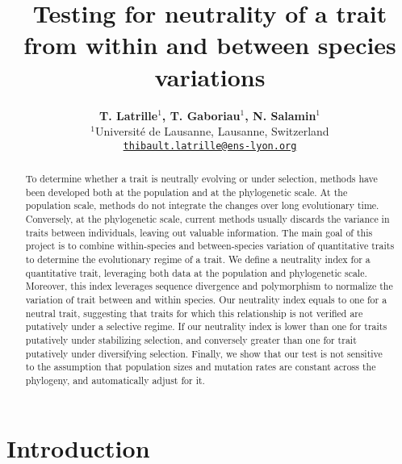 \documentclass{article}
\title{Testing for neutrality of a trait from within and between species variations}
\author{
\large
\textbf{T. {Latrille}$^{1}$, T. {Gaboriau}$^{1}$, N. {Salamin}$^{1}$}\\
\normalsize
$^{1}$Université de Lausanne, Lausanne, Switzerland\\
\texttt{\href{mailto:thibault.latrille@ens-lyon.org}{thibault.latrille@ens-lyon.org}} \\
}
\begin{document}
\maketitle

\begin{abstract}
    To determine whether a trait is neutrally evolving or under selection, methods have been developed both at the population and at the phylogenetic scale.
    At the population scale, methods do not integrate the changes over long evolutionary time.
    Conversely, at the phylogenetic scale, current methods usually discards the variance in traits between individuals, leaving out valuable information.
    The main goal of this project is to combine within-species and between-species variation of quantitative traits to determine the evolutionary regime of a trait.
    We define a neutrality index for a quantitative trait, leveraging both data at the population and phylogenetic scale.
    Moreover, this index leverages sequence divergence and polymorphism to normalize the variation of trait between and within species.
    Our neutrality index equals to one for a neutral trait, suggesting that traits for which this relationship is not verified are putatively under a selective regime.
    If our neutrality index is lower than one for traits putatively under stabilizing selection, and conversely greater than one for trait putatively under diversifying selection.
    Finally, we show that our test is not sensitive to the assumption that population sizes and mutation rates are constant across the phylogeny, and automatically adjust for it.
\end{abstract}


\section{Introduction}\label{sec:introduction}
\end{document}
